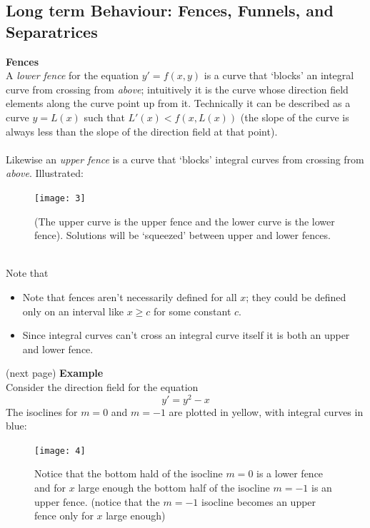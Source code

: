 \documentclass{report}
\begin{document}
\subsection{Long term Behaviour: Fences, Funnels, and Separatrices}%
\textbf{Fences}\\
A \textit{lower fence} for the equation $y'=f(x,y)$ is a curve that `blocks' an integral curve from crossing from
\textit{above}; intuitively it is the curve whose direction field elements along the curve point up from it. Technically 
it can be described as a curve $y=L(x)$ such that $L'(x)<f(x,L(x))$ (the slope of the curve is always 
less than the slope of the direction field at that point).\\
\vspace{1mm}\\
Likewise an \textit{upper fence} is a curve that `blocks' integral curves from crossing from \textit{above}. 
Illustrated:
\begin{figure}[h]
\begin{center}
\texttt{[image: 3]}\\
\end{center}
(The upper curve is the upper fence and the lower curve is the lower fence). Solutions will be `squeezed' between
upper and lower fences.
\end{figure}\\
Note that
\begin{itemize}
\item Note that fences aren't necessarily defined for all $x$; they could be defined only on an interval like
$x\geq c$ for some constant $c$.
\item Since integral curves can't cross an integral curve itself it is both an upper and lower fence.
\end{itemize}
(next page)
\newpage
\noindent\textbf{Example}\\
Consider the direction field for the equation
\begin{equation*}
y'=y^2-x
\end{equation*}
The isoclines for $m=0$ and $m=-1$ are plotted in yellow, with integral curves in blue:
\begin{figure}[h]
\begin{center}
\texttt{[image: 4]}\\
\end{center}
Notice that the bottom hald of the isocline $m=0$ is a lower fence and for $x$ large enough the bottom 
half of the isocline $m=-1$ is an upper fence. (notice that the $m=-1$ isocline becomes an upper
fence only for $x$ large enough)
\end{figure}\\
\end{document}

